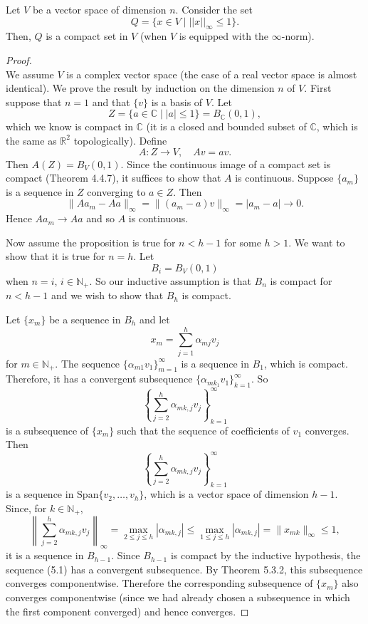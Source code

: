 \begin{theorem}
    Let \( V \) be a vector space of dimension \( n \). Consider the set
    \[
    Q = \{ x \in V \mid ||x||_{\infty} \leq 1 \}.
    \]
    Then, \( Q \) is a compact set in \( V \) (when \( V \) is equipped with the \(\infty\)-norm).
\end{theorem}
\begin{proof}
     \\
We assume \( V \) is a complex vector space (the case of a real vector space is almost identical). We prove the result by induction on the dimension \( n \) of \( V \). First suppose that \( n = 1 \) and that \( \{v\} \) is a basis of \( V \). Let
\[ Z = \{a \in \mathbb{C} \mid |a| \leq 1\} = B_{\mathbb{C}}(0,1), \]
which we know is compact in \( \mathbb{C} \) (it is a closed and bounded subset of \( \mathbb{C} \), which is the same as \( \mathbb{R}^2 \) topologically). Define
\[ A: Z \to V, \quad Av = av. \]
Then \( A(Z) = B_V(0,1) \). Since the continuous image of a compact set is compact (Theorem 4.4.7), it suffices to show that \( A \) is continuous. Suppose \( \{a_m\} \) is a sequence in \( Z \) converging to \( a \in Z \). Then
\[ \lVert Aa_m - Aa \rVert_{\infty} = \lVert (a_m - a)v \rVert_{\infty} = |a_m - a| \to 0. \]
Hence \( Aa_m \to Aa \) and so \( A \) is continuous.

Now assume the proposition is true for \( n < h - 1 \) for some \( h > 1 \). We want to show that it is true for \( n = h \). Let
\[ B_i = B_{V}(0,1) \]
when \( n = i \), \( i \in \mathbb{N}_+ \). So our inductive assumption is that \( B_{n} \) is compact for \( n < h - 1 \) and we wish to show that \( B_h \) is compact.

Let \( \{x_m\} \) be a sequence in \( B_h \) and let
\[ x_m = \sum_{j=1}^{h} \alpha_{mj}v_j \]
for \( m \in \mathbb{N}_+ \). The sequence \( \{\alpha_{m1}v_1\}_{m=1}^{\infty} \) is a sequence in \( B_1 \), which is compact. Therefore, it has a convergent subsequence \( \{\alpha_{mk_1}v_1\}_{k=1}^{\infty} \). So
\[ \left\{ \sum_{j=2}^{h} \alpha_{mk,j}v_j \right\}_{k=1}^{\infty} \]
is a subsequence of \( \{x_m\} \) such that the sequence of coefficients of \( v_1 \) converges. Then
\[ \left\{ \sum_{j=2}^{h} \alpha_{mk,j}v_j \right\}_{k=1}^{\infty} \tag{5.1} \]
is a sequence in \( \text{Span}\{v_2, \ldots, v_h\} \), which is a vector space of dimension \( h - 1 \). Since, for \( k \in \mathbb{N}_+ \),
\[ \left\lVert \sum_{j=2}^{h} \alpha_{mk,j}v_j \right\rVert_{\infty} = \max_{2 \leq j \leq h} |\alpha_{mk,j}| \leq \max_{1 \leq j \leq h} |\alpha_{mk,j}| = \lVert x_{mk} \rVert_{\infty} \leq 1, \]
it is a sequence in \( B_{h-1} \). Since \( B_{h-1} \) is compact by the inductive hypothesis, the sequence (5.1) has a convergent subsequence. By Theorem 5.3.2, this subsequence converges componentwise. Therefore the corresponding subsequence of \( \{x_m\} \) also converges componentwise (since we had already chosen a subsequence in which the first component converged) and hence converges.

\end{proof}

